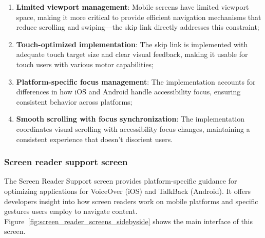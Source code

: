 \begin{enumerate}
    \item \textbf{Limited viewport management}: Mobile screens have limited viewport space, making it more critical to provide efficient navigation mechanisms that reduce scrolling and swiping—the skip link directly addresses this constraint;
    
    \item \textbf{Touch-optimized implementation}: The skip link is implemented with adequate touch target size and clear visual feedback, making it usable for touch users with various motor capabilities;
    
    \item \textbf{Platform-specific focus management}: The implementation accounts for differences in how iOS and Android handle accessibility focus, ensuring consistent behavior across platforms;
    
    \item \textbf{Smooth scrolling with focus synchronization}: The implementation coordinates visual scrolling with accessibility focus changes, maintaining a consistent experience that doesn't disorient users.
\end{enumerate}

\subsubsection{Screen reader support screen}
\label{subsubsec:screen-reader-support}

The Screen Reader Support screen provides platform-specific guidance for optimizing applications for VoiceOver (iOS) and TalkBack (Android). It offers developers insight into how screen readers work on mobile platforms and specific gestures users employ to navigate content. Figure~\ref{fig:screen_reader_screens_sidebyside} shows the main interface of this screen.

